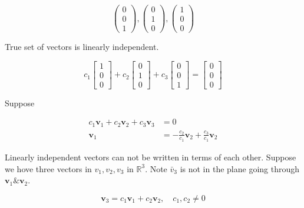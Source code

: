 \documentclass[main.tex]{subfiles}
\begin{document}
$$
\left(\begin{array}{l}
0 \\
0 \\
1
\end{array}\right),\left(\begin{array}{l}
0 \\
1 \\
0
\end{array}\right),\left(\begin{array}{l}
1 \\
0 \\
0 
\end{array}\right)
$$

True set of vectors is linearly independent.

$$
c_{1}\left[\begin{array}{l}
1 \\
0 \\
0
\end{array}\right]+c_{2}\left[\begin{array}{l}
0 \\
1 \\
0
\end{array}\right]+c_{3}\left[\begin{array}{l}
0 \\
0 \\
1
\end{array}\right]=\left[\begin{array}{l}
0 \\
0 \\
0
\end{array}\right]
$$

Suppose 

$$
\begin{aligned}
c_{1} \bm{v}_{1} + c_{2} \bm{v}_2 + c_{3} \bm{v}_{3} &= 0\\
\bm{v}_1 &= -\frac{c_2}{c_1} \bm{v}_2 + \frac{c_{3}}{c_{1}} \bm{v}_{2}
\end{aligned}
$$

Linearly independent vectors can not be written in terms of each other. Suppose we hove three vectors in $v_1, v_2, v_3$ in $\mathbb{R}^{3}$. Note $\bar{v}_{3}$ is not in the plane going through $\bm{v}_1 \& \bm{v}_2$.

$$
\bm{v}_{3}= c_{1} \bm{v}_{1} + c_{2} \bm{v}_{2}, \quad c_{1}, c_{2} \neq 0
$$
\end{document}
